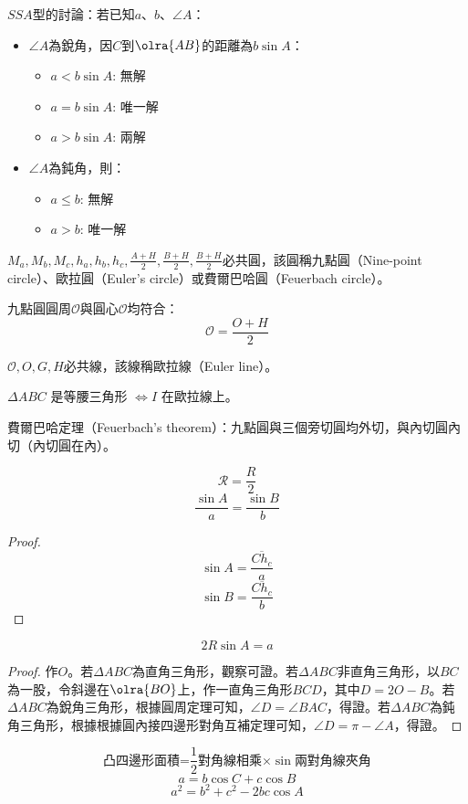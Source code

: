 \documentclass[a4paper,12pt]{report}
\begin{document}
$SSA$型的討論：若已知$a$、$b$、$\angle A$：
\begin{itemize}
\item $\angle A$為銳角，因$C$到$\olra{AB}$的距離為$b\sin A$：
\begin{itemize}
\item $a<b\sin A$: 無解
\item $a=b\sin A$: 唯一解
\item $a>b\sin A$: 兩解
\end{itemize}
\item $\angle A$為鈍角，則：
\begin{itemize}
\item $a\leq b$: 無解
\item $a>b$: 唯一解
\end{itemize}
\end{itemize}
\bit
\item $M_a,M_b,M_c,h_a,h_b,h_c,\frac{A+H}{2},\frac{B+H}{2},\frac{B+H}{2}$必共圓，該圓稱九點圓（Nine-point circle）、歐拉圓（Euler's circle）或費爾巴哈圓（Feuerbach circle）。
\item 九點圓圓周$\mathscr{O}$與圓心$\mathscr{O}$均符合：
\[\mathscr{O}=\frac{O+H}{2}\]
\item $\mathscr{O},O,G,H$必共線，該線稱歐拉線（Euler line）。
\item $\Delta ABC$ 是等腰三角形 $\iff I$ 在歐拉線上。
\item 費爾巴哈定理（Feuerbach's theorem）：九點圓與三個旁切圓均外切，與內切圓內切（內切圓在內）。
\item \[\mathscr{R}=\frac{R}{2}\]
\eit
{}
\[\frac{\sin A}{a}=\frac{\sin B}{b}\]
\begin{proof}
\[\sin A=\frac{\overline{Ch_c}}{a}\]
\[\sin B=\frac{\overline{Ch_c}}{b}\]
\end{proof}
\[2R\sin A =a\]
\begin{proof}
作$O$。若$\Delta ABC$為直角三角形，觀察可證。若$\Delta ABC$非直角三角形，以$BC$為一股，令斜邊在$\olra{BO}$上，作一直角三角形$BCD$，其中$D=2O-B$。若$\Delta ABC$為銳角三角形，根據圓周定理可知，$\angle D = \angle BAC$，得證。若$\Delta ABC$為鈍角三角形，根據根據圓內接四邊形對角互補定理可知，$\angle D = \pi- \angle A$，得證。
\end{proof}
\[\text{凸四邊形面積=$\frac{1}{2}$對角線相乘$\times\sin$兩對角線夾角}\]
\[a=b\cos C+c\cos B\]
\[a^2=b^2+c^2-2bc\cos A\]
\end{document}
